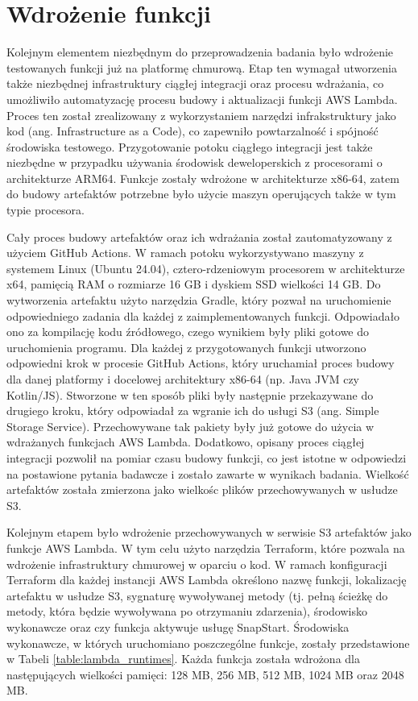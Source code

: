 \section{Wdrożenie funkcji}\label{chapter:wdrożenie_funkcji}

Kolejnym elementem niezbędnym do przeprowadzenia badania było wdrożenie testowanych funkcji już na platformę chmurową.
Etap ten wymagał utworzenia także niezbędnej infrastruktury ciągłej integracji oraz procesu wdrażania, co umożliwiło automatyzację procesu budowy i aktualizacji funkcji AWS Lambda. 
Proces ten został zrealizowany z wykorzystaniem narzędzi infrakstruktury jako kod (ang. Infrastructure as a Code), co zapewniło powtarzalność i spójność środowiska testowego.
Przygotowanie potoku ciągłego integracji jest także niezbędne w przypadku używania środowisk deweloperskich z procesorami o architekturze ARM64.
Funkcje zostały wdrożone w architekturze x86-64, zatem do budowy artefaktów potrzebne było użycie maszyn operujących także w tym typie procesora.

Cały proces budowy artefaktów oraz ich wdrażania został zautomatyzowany z użyciem GitHub Actions.
W ramach potoku wykorzystywano maszyny z systemem Linux (Ubuntu 24.04), cztero-rdzeniowym procesorem w architekturze x64, pamięcią RAM o rozmiarze 16 GB i dyskiem SSD wielkości 14 GB.
Do wytworzenia artefaktu użyto narzędzia Gradle, który pozwał na uruchomienie odpowiedniego zadania dla każdej z zaimplementowanych funkcji.
Odpowiadało ono za kompilację kodu źródłowego, czego wynikiem były pliki gotowe do uruchomienia programu.
Dla każdej z przygotowanych funkcji utworzono odpowiedni krok w procesie GitHub Actions, który uruchamiał proces budowy dla danej platformy i docelowej architektury x86-64 (np. Java JVM czy Kotlin/JS).
Stworzone w ten sposób pliki były następnie przekazywane do drugiego kroku, który odpowiadał za wgranie ich do usługi S3 (ang. Simple Storage Service).
Przechowywane tak pakiety były już gotowe do użycia w wdrażanych funkcjach AWS Lambda.
Dodatkowo, opisany proces ciągłej integracji pozwolił na pomiar czasu budowy funkcji, co jest istotne w odpowiedzi na postawione pytania badawcze i zostało zawarte w wynikach badania.
Wielkość artefaktów została zmierzona jako wielkośc plików przechowywanych w usłudze S3.

Kolejnym etapem było wdrożenie przechowywanych w serwisie S3 artefaktów jako funkcje AWS Lambda.
W tym celu użyto narzędzia Terraform, które pozwala na wdrożenie infrastruktury chmurowej w oparciu o kod.
W ramach konfiguracji Terraform dla każdej instancji AWS Lambda określono nazwę funkcji, lokalizację artefaktu w usłudze S3, sygnaturę wywoływanej metody (tj. pełną ścieżkę do metody, która będzie wywoływana po otrzymaniu zdarzenia), środowisko wykonawcze oraz czy funkcja aktywuje usługę SnapStart.
Środowiska wykonawcze, w których uruchomiano poszczególne funkcje, zostały przedstawione w Tabeli \ref{table:lambda_runtimes}.
Każda funkcja została wdrożona dla następujących wielkości pamięci: 128 MB, 256 MB, 512 MB, 1024 MB oraz 2048 MB.

